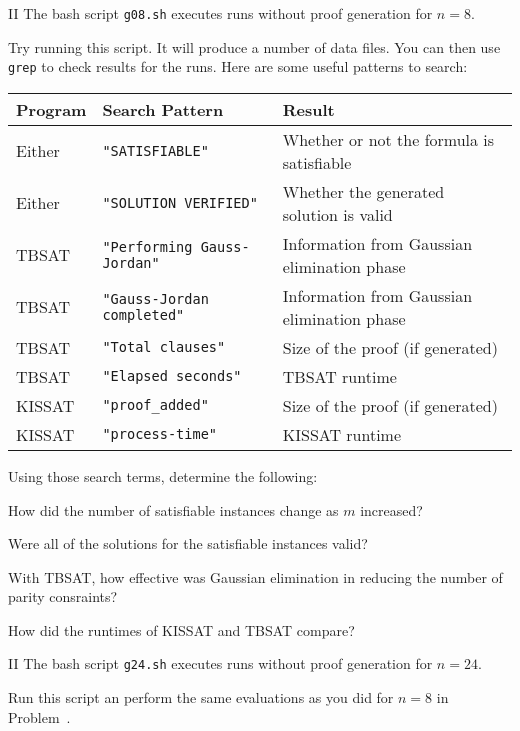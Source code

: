 \newpage
\begin{problem}{II}
The bash script \texttt{g08.sh} executes runs without proof generation
for $n=8$.

Try running this script.  It will produce a number of data files.  You
can then use \texttt{grep} to check results for the runs.  Here are some useful patterns to search:
\begin{center}
\begin{tabular}{lll}
\toprule
Program & Search Pattern & Result \\
\midrule
Either & \texttt{"SATISFIABLE"} & Whether or not the formula is satisfiable \\
Either & \texttt{"SOLUTION VERIFIED"} & Whether the generated solution is valid \\
\midrule
TBSAT & \texttt{"Performing Gauss-Jordan"} & Information from Gaussian elimination phase \\
TBSAT & \texttt{"Gauss-Jordan completed"} & Information from Gaussian elimination phase \\
TBSAT & \texttt{"Total clauses"} & Size of the proof (if generated) \\
TBSAT & \texttt{"Elapsed seconds"} & TBSAT runtime \\
\midrule
KISSAT & \texttt{"proof\_added"} & Size of the proof (if generated) \\
KISSAT & \texttt{"process-time"} & KISSAT runtime \\
\bottomrule
\end{tabular}
\end{center}

Using those search terms, determine the following:
\begin{choice}
\item How did the number of satisfiable instances change as $m$ increased?
\item Were all of the solutions for the satisfiable instances valid?
\item With TBSAT, how effective was Gaussian elimination in reducing the number of parity consraints?
\item How did the runtimes of KISSAT and TBSAT compare?
\end{choice}
\end{problem}

\begin{problem}{II}
The bash script \texttt{g24.sh} executes runs without proof generation
for $n=24$.

Run this script an perform the same evaluations as you did for $n=8$ in Problem~.
\end{problem}

